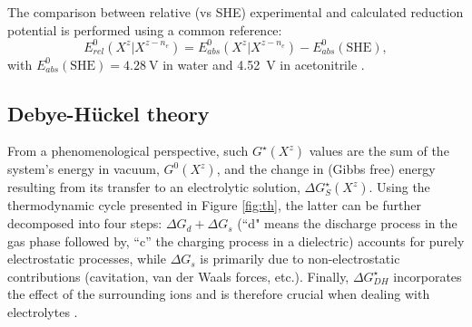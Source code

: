\documentclass[review,preprint]{elsarticle}
\begin{document}
The comparison between relative (vs SHE) experimental and calculated reduction potential is performed using a common reference:\begin{equation}
	E^0_{rel}(X^z|X^{z-n_e})  = E^0_{abs}(X^z|X^{z-n_e}) - E^{0}_{abs}(\text{SHE}), \label{eq:ecalc}
\end{equation}
with $E^0_{abs}(\text{SHE}) = \SI{4.28}{\volt}$ in water and \SI{4.52}{\volt} in acetonitrile \cite{marenichComputationalElectrochemistryPrediction2014}.


\subsection{Debye-Hückel theory}

From a phenomenological perspective, such $G^\star(X^z)$ values are the sum of the system's energy in vacuum, $G^0(X^z)$, and the change in (Gibbs free) energy resulting from its transfer to an electrolytic solution, $\Delta G_S^\star(X^z)$. Using the thermodynamic cycle presented in Figure \ref{fig:th}, the latter can be further decomposed into four steps: $\Delta G_d + \Delta G_s$ (``d" means the discharge process in the gas phase followed by,  ``c'' the charging process in a dielectric) accounts for purely electrostatic processes, while $\Delta G_s$ is primarily due to non-electrostatic contributions (cavitation, van der Waals forces, etc.). Finally, $\Delta G^\star_{DH}$ incorporates the effect of the surrounding ions and is therefore crucial when dealing with electrolytes \cite{silvaImprovingBornEquation2024}.
\end{document}
